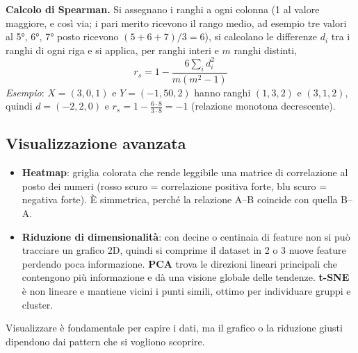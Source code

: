 \textbf{Calcolo di Spearman.} Si assegnano i ranghi a ogni colonna (1 al valore maggiore, e così via; i pari merito ricevono il rango medio, ad esempio tre valori al 5°, 6°, 7° posto ricevono $(5+6+7)/3=6$), si calcolano le differenze $d_i$ tra i ranghi di ogni riga e si applica, per ranghi interi e $m$ ranghi distinti,
$$r_s=1-\frac{6\sum_i d_i^2}{m(m^2-1)}$$
\emph{Esempio}: $X=(3,0,1)$ e $Y=(-1,50,2)$ hanno ranghi $(1,3,2)$ e $(3,1,2)$, quindi $d=(-2,2,0)$ e $r_s=1-\frac{6\cdot 8}{3\cdot 8}=-1$ (relazione monotona decrescente).

\subsection*{Visualizzazione avanzata}

\begin{itemize}
    \item \textbf{Heatmap}: griglia colorata che rende leggibile una matrice di correlazione al posto dei numeri (rosso scuro = correlazione positiva forte, blu scuro = negativa forte). È simmetrica, perché la relazione A–B coincide con quella B–A.
    \item \textbf{Riduzione di dimensionalità}: con decine o centinaia di feature non si può tracciare un grafico 2D, quindi si comprime il dataset in 2 o 3 nuove feature perdendo poca informazione. \textbf{PCA} trova le direzioni lineari principali che contengono più informazione e dà una visione globale delle tendenze. \textbf{t-SNE} è non lineare e mantiene vicini i punti simili, ottimo per individuare gruppi e cluster.
\end{itemize}

Visualizzare è fondamentale per capire i dati, ma il grafico o la riduzione giusti dipendono dai pattern che si vogliono scoprire.